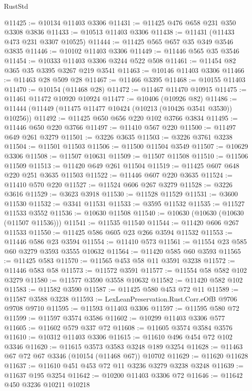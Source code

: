 \begin{lexlean}{RustStd}
\begin{coremodule}
@11425 := @10134 @11403 @3306
@11431 := @11425 @476 @658 @231 @350 @3308 @3836
@11433 := @10513 @11403 @3306
@11438 := @11431 (@11433 @473 @231 @3307 @10525)
@11444 := @11425 @565 @657 @35 @349 @3546 @3835
@11446 := @10102 @11403 @3306
@11449 := @11446 @565 @35 @3546
@11454 := @10333 @11403 @3306 @3244 @522 @508
@11461 := @11454 @82 @365 @35 @3395 @3267 @219 @3541
@11463 := @10146 @11403 @3306
@11466 := @11463 @28 @509 @28
@11467 := @11466 @3395
@11468 := @10155 @11403
@11470 := @10154 (@11468 @28)
@11472 := @11467 @11470 @10915
@11475 := @11461 @11472 @10920 @10924
@11477 := @10406 (@10926 @82)
@11486 := @11444 (@11449 (@11475 @11477 @10424 (@10213 (@10426 @3541 @3530)) @10256))
@11492 := @11425 @650 @656 @220 @102 @3766 @3834
@11495 := @11446 @650 @220 @3766
@11497 := @11410 @567 @220
@11500 := @11497 @649 @261 @3279
@11501 := @3226 @3635
@11503 := @3226 @3761 @3238
@11504 := @11501 @11503
@11506 := @11500 @11504 @3549
@11507 := @10629 @3306
@11508 := @11507 @10631
@11509 := @11507 @11508
@11510 := @11506 @11509
@11513 := @11420 @649 @261 @11504
@11519 := @11425 @607 @648 @220 @251 @3635 @11503
@11522 := @11446 @607 @220 @3635
@11524 := @11410 @570 @220
@11527 := @11524 @606 @267 @3279
@11528 := @3226 @3616
@11529 := @3623 @3918
@11530 := @11528 @11529
@11531 := @3600 @11530
@11532 := @3341 @11531
@11533 := @3595 @11532
@11535 := @11527 @11533 @3552
@11536 := @10630 @11508
@11540 := @10630 (@10630 (@10630 (@11507 @11536)))
@11541 := @11535 @11540
@11544 := @11420 @606 @267 @11533
@11550 := @11425 @586 @605 @23 @266 @3594 @11532
@11553 := @11446 @586 @23 @3594
@11554 := @11410 @573
@11561 := @11554 @23 @585 @60 @3279 @3593 @3555 @10632
@11564 := @11420 @585 @60 @3593
@11565 := @11425 @583
@11570 := @11565 @453 @58 @11 @3591 @3238
@11572 := @11446 @583 @58
@11573 := @11572 @3591
@11577 := @11554 @58 @582 @102 @3279
@11580 := @11577 @3590 @3558 @10632
@11582 := @11420 @582 @102
@11583 := @11582 @3590
@11587 := @11425 @580 @453 @72 @11
@11589 := @11587 @3588 @3238
@11593 := LexLeanPreservation.Rust.Corr.eOfB @9706 @9708 @9710
@11595 := @11593 @11403 @3306
@11597 := @11595 @580 @72
@11599 := @11597 @3574 @3586
@11602 := @10299 @11403 @3306 @577
@11605 := @11602 @579 @337 @72
@11608 := @11605 @3574 @3584 @3576
@11610 := @10312 @11403 @3306
@11615 := @11610 @496 @454 @72 @102 @3346
@11620 := @11615 @3573 @3583 @3248 @189 @3254
@11628 := @11463 @67 @72 @67 @3346 (@10154 (@11468 @67)) @10702
@11629 := @11620 @11628
@11637 := @11610 @451 @453 @72 @11 @3236 @3279 @3238 @3248
@11639 := @11637 @195 @3254
@11642 := @10200 @11403 @3306 @72
@11646 := @11642 @450 @3236 @10211 @10218

\end{coremodule}
\end{lexlean}
